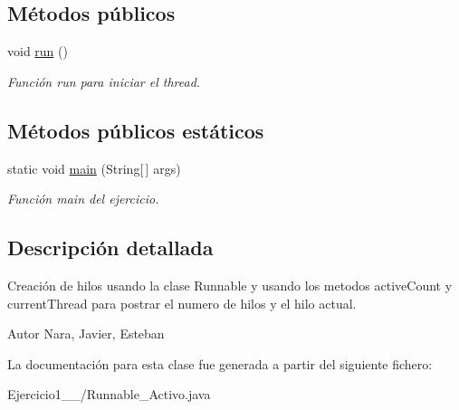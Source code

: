 \subsection*{Métodos públicos}
\begin{DoxyCompactItemize}
\item 
\hypertarget{class_ejercicio1__1__4_1_1_runnable___activo_acba1ef516ab945a02ad45134bf412c24}{}void \hyperlink{class_ejercicio1__1__4_1_1_runnable___activo_acba1ef516ab945a02ad45134bf412c24}{run} ()\label{class_ejercicio1__1__4_1_1_runnable___activo_acba1ef516ab945a02ad45134bf412c24}

\begin{DoxyCompactList}\small\item\em Función run para iniciar el thread. \end{DoxyCompactList}\end{DoxyCompactItemize}
\subsection*{Métodos públicos estáticos}
\begin{DoxyCompactItemize}
\item 
\hypertarget{class_ejercicio1__1__4_1_1_runnable___activo_af6744837b413387636ccc487b8bf54cc}{}static void \hyperlink{class_ejercicio1__1__4_1_1_runnable___activo_af6744837b413387636ccc487b8bf54cc}{main} (String\mbox{[}$\,$\mbox{]} args)\label{class_ejercicio1__1__4_1_1_runnable___activo_af6744837b413387636ccc487b8bf54cc}

\begin{DoxyCompactList}\small\item\em Función main del ejercicio. \end{DoxyCompactList}\end{DoxyCompactItemize}


\subsection{Descripción detallada}
Creación de hilos usando la clase Runnable y usando los metodos active\+Count y current\+Thread para postrar el numero de hilos y el hilo actual. 

\begin{DoxyAuthor}{Autor}
Nara, Javier, Esteban 
\end{DoxyAuthor}


La documentación para esta clase fue generada a partir del siguiente fichero\+:\begin{DoxyCompactItemize}
\item 
Ejercicio1\+\_\+\_/Runnable\+\_\+\+Activo.\+java\end{DoxyCompactItemize}
